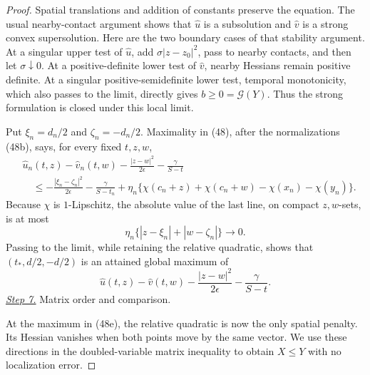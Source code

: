 \documentclass{smfart}
\theoremstyle{definition}
\newcommand{\1}{\mathbf 1}
\begin{document}
\begin{proof}
Spatial translations and addition of constants preserve the equation.
The usual nearby-contact argument shows that $\widehat u$ is a
subsolution and $\widehat v$ is a strong convex supersolution.  Here
are the two boundary cases of that stability argument.  At a singular
upper test of $\widehat u$, add
$\sigma|z-z_ 0|^2$, pass to nearby contacts, and then let
$\sigma\downarrow0$.  At a positive-definite lower test of
$\widehat v$, nearby Hessians remain positive definite.  At a
singular positive-semidefinite lower test, temporal monotonicity,
which also passes to the limit, directly gives
$b\geq0=\mathcal G(Y)$.  Thus the strong formulation is closed under this
local limit.

Put $\xi_ n=d_ n/2$ and $\zeta_ n=-d_ n/2$.  Maximality in (48),
after the normalizations (48b), says, for every fixed $t,z,w$,
\begin{equation}
\begin{split}
&\widehat u_ n(t,z)-\widehat v_ n(t,w)
-\frac{|z-w|^2}{2\epsilon}-\frac{\gamma}{S-t}\\
&\quad\leq
-\frac{|\xi_ n-\zeta_ n|^2}{2\epsilon}
-\frac{\gamma}{S-t_ n}
+\eta_ n\{\chi(c_ n+z)+\chi(c_ n+w)
-\chi(x_ n)-\chi(y_ n)\}.                         
\end{split}
\tag{48c}
\end{equation}
Because $\chi$ is $1$-Lipschitz, the absolute value of the last
line, on compact $z,w$-sets, is at most
\begin{equation}
\eta_ n\{|z-\xi_ n|+|w-\zeta_ n|\}\longrightarrow0.
\tag{48d}
\end{equation}
Passing to the limit, while retaining the relative quadratic, shows
that $(t_ *,d/2,-d/2)$ is an attained global maximum of
\begin{equation}
\widehat u(t,z)-\widehat v(t,w)
-\frac{|z-w|^2}{2\epsilon}-\frac{\gamma}{S-t}.
\tag{48e}
\end{equation}
\smallskip\noindent
\underline{\textit{Step 7.}} Matrix order and comparison.

At the maximum in (48e), the relative quadratic is now the only
spatial penalty.  Its Hessian vanishes when both points move by the
same vector.  We use these directions in the doubled-variable matrix
inequality to obtain $X\leq Y$ with no localization error.


\end{proof}
\end{document}
